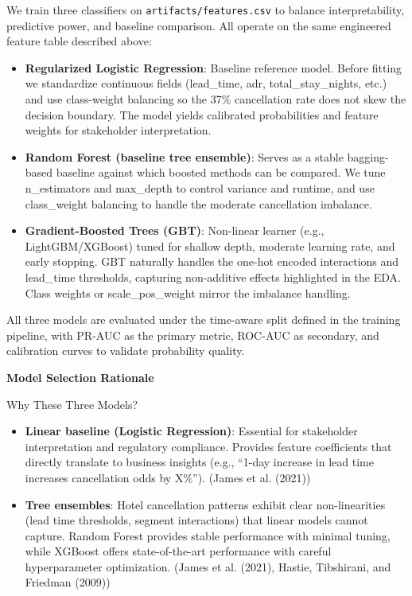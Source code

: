 \documentclass[
  letterpaper,
  DIV=11,
  numbers=noendperiod]{scrartcl}
\begin{document}
We train three classifiers on \texttt{artifacts/features.csv} to balance
interpretability, predictive power, and baseline comparison. All operate
on the same engineered feature table described above:

\begin{itemize}
\item
  \textbf{Regularized Logistic Regression}: Baseline reference model.
  Before fitting we standardize continuous fields (lead\_time, adr,
  total\_stay\_nights, etc.) and use class-weight balancing so the 37\%
  cancellation rate does not skew the decision boundary. The model
  yields calibrated probabilities and feature weights for stakeholder
  interpretation.
\item
  \textbf{Random Forest (baseline tree ensemble)}: Serves as a stable
  bagging-based baseline against which boosted methods can be compared.
  We tune n\_estimators and max\_depth to control variance and runtime,
  and use class\_weight balancing to handle the moderate cancellation
  imbalance.
\item
  \textbf{Gradient-Boosted Trees (GBT)}: Non-linear learner (e.g.,
  LightGBM/XGBoost) tuned for shallow depth, moderate learning rate, and
  early stopping. GBT naturally handles the one-hot encoded interactions
  and lead\_time thresholds, capturing non-additive effects highlighted
  in the EDA. Class weights or scale\_pos\_weight mirror the imbalance
  handling.
\end{itemize}

All three models are evaluated under the time-aware split defined in the
training pipeline, with PR-AUC as the primary metric, ROC-AUC as
secondary, and calibration curves to validate probability quality.

\textbf{Model Selection Rationale}

Why These Three Models?

\begin{itemize}
\item
  \textbf{Linear baseline (Logistic Regression)}: Essential for
  stakeholder interpretation and regulatory compliance. Provides feature
  coefficients that directly translate to business insights (e.g.,
  ``1-day increase in lead time increases cancellation odds by X\%'').
  (James et al. (2021))
\item
  \textbf{Tree ensembles}: Hotel cancellation patterns exhibit clear
  non-linearities (lead time thresholds, segment interactions) that
  linear models cannot capture. Random Forest provides stable
  performance with minimal tuning, while XGBoost offers state-of-the-art
  performance with careful hyperparameter optimization. (James et al.
  (2021), Hastie, Tibshirani, and Friedman (2009))
\end{itemize}
\end{document}
